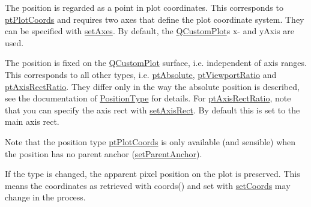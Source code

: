 \begin{DoxyItemize}
\item The position is regarded as a point in plot coordinates. This corresponds to \mbox{\hyperlink{class_q_c_p_item_position_aad9936c22bf43e3d358552f6e86dbdc8ad5ffb8dc99ad73263f7010c77342294c}{pt\+Plot\+Coords}} and requires two axes that define the plot coordinate system. They can be specified with \mbox{\hyperlink{class_q_c_p_item_position_a2185f45c75ac8cb9be89daeaaad50e37}{set\+Axes}}. By default, the \mbox{\hyperlink{class_q_custom_plot}{Q\+Custom\+Plot}}\textquotesingle{}s x-\/ and y\+Axis are used.\end{DoxyItemize}
\begin{DoxyItemize}
\item The position is fixed on the \mbox{\hyperlink{class_q_custom_plot}{Q\+Custom\+Plot}} surface, i.\+e. independent of axis ranges. This corresponds to all other types, i.\+e. \mbox{\hyperlink{class_q_c_p_item_position_aad9936c22bf43e3d358552f6e86dbdc8a564f5e53e550ead1ec5fc7fc7d0b73e0}{pt\+Absolute}}, \mbox{\hyperlink{class_q_c_p_item_position_aad9936c22bf43e3d358552f6e86dbdc8ac7d6aa89ceacb39658b0d6da061c789a}{pt\+Viewport\+Ratio}} and \mbox{\hyperlink{class_q_c_p_item_position_aad9936c22bf43e3d358552f6e86dbdc8a01080fd00eaf09fa238ef6b73bbfef75}{pt\+Axis\+Rect\+Ratio}}. They differ only in the way the absolute position is described, see the documentation of \mbox{\hyperlink{class_q_c_p_item_position_aad9936c22bf43e3d358552f6e86dbdc8}{Position\+Type}} for details. For \mbox{\hyperlink{class_q_c_p_item_position_aad9936c22bf43e3d358552f6e86dbdc8a01080fd00eaf09fa238ef6b73bbfef75}{pt\+Axis\+Rect\+Ratio}}, note that you can specify the axis rect with \mbox{\hyperlink{class_q_c_p_item_position_a0cd9b326fb324710169e92e8ca0041c2}{set\+Axis\+Rect}}. By default this is set to the main axis rect.\end{DoxyItemize}
Note that the position type \mbox{\hyperlink{class_q_c_p_item_position_aad9936c22bf43e3d358552f6e86dbdc8ad5ffb8dc99ad73263f7010c77342294c}{pt\+Plot\+Coords}} is only available (and sensible) when the position has no parent anchor (\mbox{\hyperlink{class_q_c_p_item_position_ac094d67a95d2dceafa0d50b9db3a7e51}{set\+Parent\+Anchor}}).

If the type is changed, the apparent pixel position on the plot is preserved. This means the coordinates as retrieved with coords() and set with \mbox{\hyperlink{class_q_c_p_item_position_aa988ba4e87ab684c9021017dcaba945f}{set\+Coords}} may change in the process.

